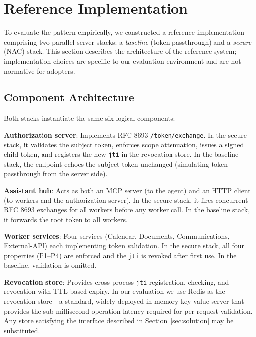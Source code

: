 \documentclass[journal]{IEEEtran}
\begin{document}
\section{Reference Implementation}
\label{sec:impl}

To evaluate the pattern empirically, we constructed a reference implementation
comprising two parallel server stacks: a \textit{baseline} (token passthrough)
and a \textit{secure} (NAC) stack. This section describes the architecture of the
reference system; implementation choices are specific to our evaluation environment
and are not normative for adopters.

\subsection{Component Architecture}

Both stacks instantiate the same six logical components:

\textbf{Authorization server}: Implements RFC 8693 \texttt{/token/exchange}.
In the secure stack, it validates the subject token, enforces scope attenuation,
issues a signed child token, and registers the new \texttt{jti} in the revocation
store. In the baseline stack, the endpoint echoes the subject token unchanged
(simulating token passthrough from the server side).

\textbf{Assistant hub}: Acts as both an MCP server (to the agent) and an HTTP
client (to workers and the authorization server). In the secure stack, it
fires concurrent RFC 8693 exchanges for all workers before any worker call. In
the baseline stack, it forwards the root token to all workers.

\textbf{Worker services}: Four services (Calendar, Documents, Communications,
External-API) each implementing token validation. In the secure stack,
all four properties (P1--P4) are enforced and the \texttt{jti} is revoked after
first use. In the baseline, validation is omitted.

\textbf{Revocation store}: Provides cross-process \texttt{jti} registration,
checking, and revocation with TTL-based expiry. In our evaluation we use Redis
\cite{redis} as the revocation store---a standard, widely deployed
in-memory key-value server that provides the sub-millisecond operation latency
required for per-request validation. Any store satisfying the interface described
in Section~\ref{sec:solution} may be substituted.
\end{document}
